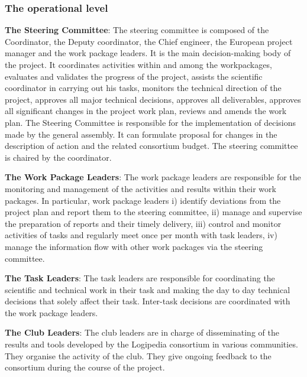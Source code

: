 \subsubsection*{The operational level}

\begin{compactitem}
\item{\bf The Steering Committee}:
The steering committee is composed of the Coordinator, the Deputy
coordinator, the Chief engineer, the European project manager and the
work package leaders.  It is the main decision-making body of the
project. It coordinates activities within and among the workpackages,
evaluates and validates the progress of the project, assists the
scientific coordinator in carrying out his tasks, monitors the
technical direction of the project, approves all major technical
decisions, approves all deliverables, approves all significant changes
in the project work plan, reviews and amends the work plan. The
Steering Committee is responsible for the implementation of decisions
made by the general assembly. It can formulate proposal for changes in
the description of action and the related consortium budget. The
steering committee is chaired by the coordinator.

\item{\bf The Work Package Leaders}: The work package leaders are
responsible for the monitoring and management of the activities and
results within their work packages. In particular, work package
leaders i) identify deviations from the project plan and report them
to the steering committee, ii) manage and supervise the preparation of
reports and their timely delivery, iii) control and monitor activities
of tasks and regularly meet once per month with task leaders, iv)
manage the information flow with other work packages via the steering
committee.

\item{\bf The Task Leaders}: The task leaders are responsible for
coordinating the scientific and technical work in their task and
making the day to day technical decisions that solely affect their
task. Inter-task decisions are coordinated with the work package
leaders.

\item{\bf The Club Leaders}: The club leaders are in charge of
  disseminating of the results and tools developed by the Logipedia
  consortium in various communities. They organise the activity of the
  club. They give ongoing feedback to the consortium during the course
  of the project.
\end{compactitem}

